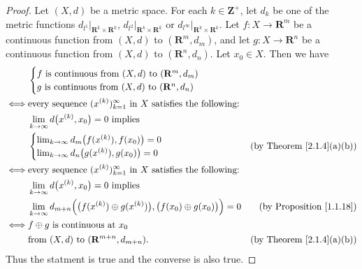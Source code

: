 \begin{proof}
    Let \((X, d)\) be a metric space.
    For each \(k \in \mathbf{Z}^+\), let \(d_k\) be one of the metric functions \(d_{l^1}|_{\mathbf{R}^k \times \mathbf{R}^k}\), \(d_{l^2}|_{\mathbf{R}^k \times \mathbf{R}^k}\) or \(d_{l^\infty}|_{\mathbf{R}^k \times \mathbf{R}^k}\).
    Let \(f : X \to \mathbf{R}^m\) be a continuous function from \((X, d)\) to \((\mathbf{R}^m, d_m)\), and let \(g : X \to \mathbf{R}^n\) be a continuous function from \((X, d)\) to \((\mathbf{R}^n, d_n)\).
    Let \(x_0 \in X\).
    Then we have
    \begin{align*}
             & \begin{cases}
            f \text{ is continuous from } (X, d) \text{ to } (\mathbf{R}^m, d_m) \\
            g \text{ is continuous from } (X, d) \text{ to } (\mathbf{R}^n, d_n)
        \end{cases}                                                                                                                                \\
        \iff & \text{every sequence } (x^{(k)})_{k = 1}^\infty \text{ in } X \text{ satisfies the following:}                                                            \\
             & \lim_{k \to \infty} d\big(x^{(k)}, x_0\big) = 0 \text{ implies }                                                                                          \\
             & \begin{cases}
            \lim_{k \to \infty} d_m\big(f(x^{(k)}), f(x_0)\big) = 0 \\
            \lim_{k \to \infty} d_n\big(g(x^{(k)}), g(x_0)\big) = 0
        \end{cases}                                                                                        & \text{(by Theorem \ref{2.1.4}(a)(b))} \\
        \iff & \text{every sequence } (x^{(k)})_{k = 1}^\infty \text{ in } X \text{ satisfies the following:}                                                            \\
             & \lim_{k \to \infty} d\big(x^{(k)}, x_0\big) = 0 \text{ implies }                                                                                          \\
             & \lim_{k \to \infty} d_{m + n}\Big(\big(f(x^{(k)}) \oplus g(x^{(k)})\big), \big(f(x_0) \oplus g(x_0)\big)\Big) = 0 & \text{(by Proposition \ref{1.1.18})}  \\
        \iff & f \oplus g \text{ is continuous at } x_0                                                                                                                  \\
             & \text{from } (X, d) \text{ to } (\mathbf{R}^{m + n}, d_{m + n}).                                                  & \text{(by Theorem \ref{2.1.4}(a)(b))}
    \end{align*}
    Thus the statment is true and the converse is also true.
\end{proof}

